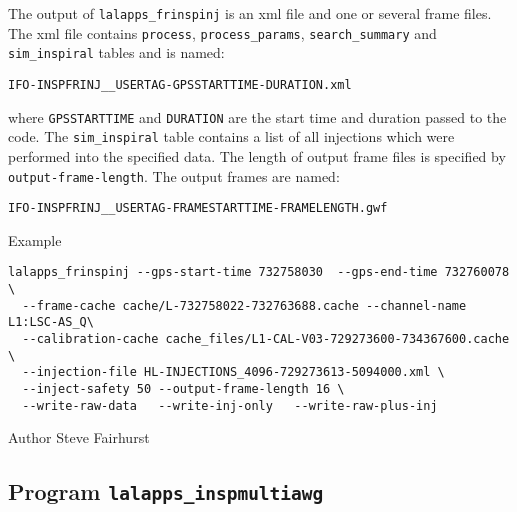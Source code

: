 \begin{entry}
The output of \verb$lalapps_frinspinj$ is an xml file and one or several
frame files.  The xml file contains
\verb$process$, \verb$process_params$, \verb$search_summary$ and
\verb$sim_inspiral$ tables and is named:
\begin{center}
\texttt{IFO-INSPFRINJ\_\_USERTAG-GPSSTARTTIME-DURATION.xml}\\
\end{center}
where \texttt{GPSSTARTTIME} and \texttt{DURATION} are the start time and
duration passed to the code.
The \verb$sim_inspiral$ table contains a
list of all injections which were performed into the specified data.
The length of output frame files is specified by
\verb$output-frame-length$.  The output frames are named:
\begin{center}
\texttt{IFO-INSPFRINJ\_\_USERTAG-FRAMESTARTTIME-FRAMELENGTH.gwf}\\
\end{center}

\item[Example]
\begin{verbatim}
lalapps_frinspinj --gps-start-time 732758030  --gps-end-time 732760078 \
  --frame-cache cache/L-732758022-732763688.cache --channel-name L1:LSC-AS_Q\	
  --calibration-cache cache_files/L1-CAL-V03-729273600-734367600.cache \
  --injection-file HL-INJECTIONS_4096-729273613-5094000.xml \
  --inject-safety 50 --output-frame-length 16 \
  --write-raw-data   --write-inj-only   --write-raw-plus-inj 
\end{verbatim}

\item[Author] 
Steve Fairhurst
\end{entry}




%
% 
\clearpage
\subsection{Program \texttt{lalapps\_inspmultiawg}}
\label{program:lalapps-inspmultiawg}

